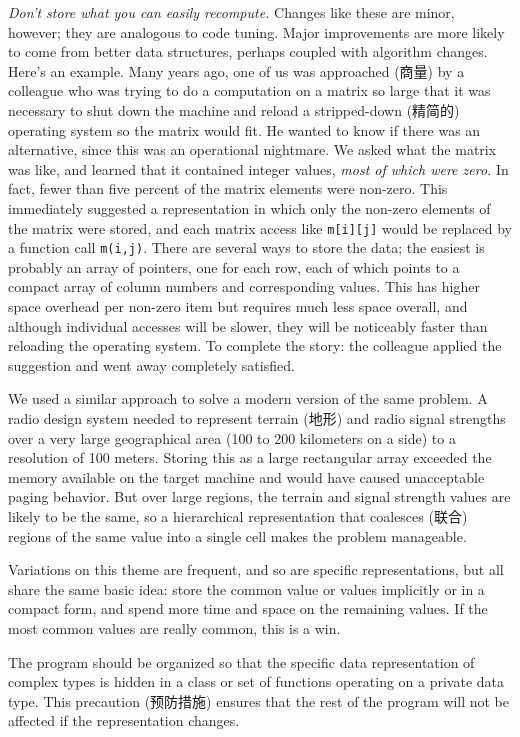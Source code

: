 \emph{Don't store what you can easily recompute.} Changes like these are
minor, however; they are analogous to code tuning. Major improvements are
more likely to come from better data structures, perhaps coupled with
algorithm changes. Here's an example.  Many years ago, one of us was
approached (商量) by a colleague who was trying to do a computation on a
matrix so large that it was necessary to shut down the machine and reload a
stripped-down (精简的) operating system so the matrix would fit. He wanted
to know if there was an alternative, since this was an operational
nightmare. We asked what the matrix was like, and learned that it contained
integer values, \textit{most of which were zero.} In fact, fewer than five
percent of the matrix elements were non-zero. This immediately suggested a
representation in which only the non-zero elements of the matrix were
stored, and each matrix access like \verb'm[i][j]' would be replaced by a
function call \verb'm(i,j)'. There are several ways to store the data; the
easiest is probably an array of pointers, one for each row, each of which
points to a compact array of column numbers and corresponding values. This
has higher space overhead per non-zero item but requires much less space
overall, and although individual accesses will be slower, they will be
noticeably faster than reloading the operating system.  To complete the
story: the colleague applied the suggestion and went away completely
satisfied.

We used a similar approach to solve a modern version of the same problem. A
radio design system needed to represent terrain (地形) and radio signal
strengths over a very large geographical area (100 to 200 kilometers on a
side) to a resolution of 100 meters. Storing this as a large rectangular
array exceeded the memory available on the target machine and would have
caused unacceptable paging behavior. But over large regions, the terrain
and signal strength values are likely to be the same, so a hierarchical
representation that coalesces (联合) regions of the same value into a
single cell makes the problem manageable.

Variations on this theme are frequent, and so are specific representations,
but all share the same basic idea: store the common value or values
implicitly or in a compact form, and spend more time and space on the
remaining values. If the most common values are really common, this is a
win.

The program should be organized so that the specific data representation of
complex types is hidden in a class or set of functions operating on a
private data type.  This precaution (预防措施) ensures that the rest of the
program will not be affected if the representation changes.

